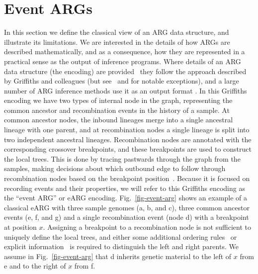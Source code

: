 \documentclass{article}
\newcommand{\noderef}[1]{\textsf{#1}}
\begin{document}
\section{Event ARGs}
\label{sec-eARG}
In this section we define the classical view of an ARG data structure,
and illustrate its limitations. We are
interested in the details of how ARGs are described mathematically,
and as a consequence, how they are represented in a practical sense
as the output of inference programs.
Where details of an ARG data structure (the encoding) are
provided~\citep[e.g.][]{
wiuf1999recombination,gusfield2014recombinatorics,hayman2023recoverability}
they follow the approach described by Griffiths and colleagues
(but see~\citet{parida2011minimal} and \citet{zhang2023biobank}
for notable exceptions), and a large number of
ARG inference methods use it as an output format
\citep[e.g.][]{song2004minimum,song2005efficient,rasmussen2014genome,
heine2018bridging,ignatieva2021kwarg}.
In this Griffiths encoding we have two types of internal node in the graph,
representing the common ancestor and recombination events
in the history of a sample.
At common ancestor nodes, the inbound lineages merge into a
single ancestral lineage with one parent, and at recombination
nodes a single lineage is split into two independent
ancestral lineages. Recombination nodes are annotated with
the corresponding crossover breakpoints, and these breakpoints
are used to construct the local trees.
This is done by tracing pastwards through the graph from the samples,
making decisions about which outbound edge to follow through
recombination nodes based on the breakpoint
position~\citep{griffiths1996ancestral}.
Because it is focused on recording events and their properties,
we will refer to this Griffiths encoding as the ``event ARG'' or eARG
encoding. Fig.~\ref{fig-event-arg} shows an example of a classical
eARG with three sample genomes (\noderef{a}, \noderef{b}, and \noderef{c}),
three common ancestor events (\noderef{e}, \noderef{f}, and \noderef{g})
and a single recombination event (node \noderef{d}) with a breakpoint
at position $x$.
Assigning a breakpoint to a recombination node is
not sufficient to uniquely define the local trees, and either
some additional ordering rules~\citep[e.g.][]{griffiths1996ancestral} or
explicit information~\citep[e.g.][]{gusfield2014recombinatorics,ignatieva2021kwarg}
is required to distinguish the left and right parents.
We assume in Fig.~\ref{fig-event-arg} that \noderef{d} inherits genetic material to the
left of $x$ from \noderef{e} and to the right of $x$ from \noderef{f}.
\end{document}
